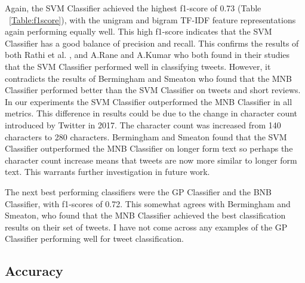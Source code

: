 Again, the SVM Classifier achieved the highest f1-score of 0.73 (Table ~\ref{Table:f1score}), with the unigram and bigram TF-IDF feature representations again performing equally well. This high f1-score indicates that the SVM Classifier has a good balance of precision and recall. This confirms the results of both Rathi et al. \cite{Raithi2018}, and A.Rane and A.Kumar \cite{Rane2018} who both found in their studies that the SVM Classifier performed well in classifying tweets. However, it contradicts the results of Bermingham and Smeaton \cite{Berm2010} who found that the MNB Classifier performed better than the SVM Classifier on tweets and short reviews. In our experiments the SVM Classifier outperformed the MNB Classifier in all metrics. This difference in results could be due to the change in character count introduced by Twitter in 2017. The character count was increased from 140 characters to 280 characters. Bermingham and Smeaton \cite{Berm2010} found that the SVM Classifier outperformed the MNB Classifier on longer form text so perhaps the character count increase means that tweets are now more similar to longer form text. This warrants further investigation in future work.

The next best performing classifiers were the GP Classifier and the BNB Classifier, with f1-scores of 0.72. This somewhat agrees with Bermingham and Smeaton, who found that the MNB Classifier achieved the best classification results on their set of tweets. I have not come across any examples of the GP Classifier performing well for tweet classification.

\subsection{Accuracy}


